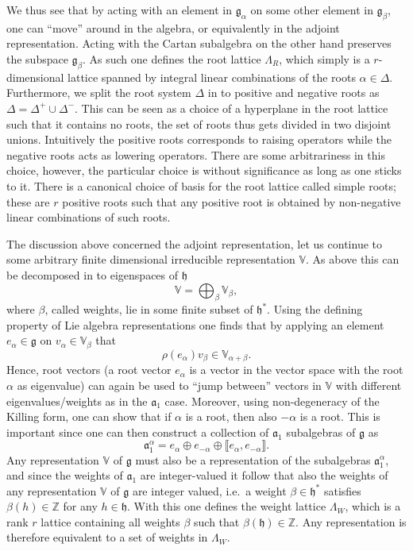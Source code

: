 We thus see that by acting with an element in $\mathfrak{g}_\alpha$ on some other element in $\mathfrak{g}_\beta$, one can ``move'' around in the algebra, or equivalently in the adjoint representation. Acting with the Cartan subalgebra on the other hand preserves the subspace $\mathfrak{g}_\beta$. As such one defines the root lattice $\Lambda_R$, which simply is a $r$-dimensional lattice spanned by integral linear combinations of the roots $\alpha\in\Delta$. Furthermore, we split the root system $\Delta$ in to positive and negative roots as $\Delta = \Delta^+\cup\Delta^-$. This can be seen as a choice of a hyperplane in the root lattice such that it contains no roots, the set of roots thus gets divided in two disjoint unions. Intuitively the positive roots corresponds to raising operators while the negative roots acts as lowering operators. There are some arbitrariness in this choice, however, the particular choice is without significance as long as one sticks to it. There is a canonical choice of basis for the root lattice called simple roots; these are $r$ positive roots such that any positive root is obtained by non-negative linear combinations of such roots. 

The discussion above concerned the adjoint representation, let us continue to some arbitrary finite dimensional irreducible representation $\mathbb{V}$. As above this can be decomposed in to eigenspaces of $\mathfrak{h}$
\begin{equation}
    \mathbb{V} = \bigoplus_\beta \mathbb{V}_\beta,
\end{equation}
where $\beta$, called weights, lie in some finite subset of $\mathfrak{h}^*$. Using the defining property of Lie algebra representations one finds that by applying an element $e_\alpha\in\mathfrak{g}$ on $v_\alpha\in\mathbb{V}_\beta$ that 
\begin{equation}
    \rho(e_\alpha)v_\beta \in \mathbb{V}_{\alpha+\beta}.
\end{equation}
Hence, root vectors (a root vector $e_\alpha$ is a vector in the vector space with the root $\alpha$ as eigenvalue) can again be used to ``jump between'' vectors in $\mathbb{V}$ with different eigenvalues/weights as in the $\mathfrak{a}_1$ case. Moreover, using non-degeneracy of the Killing form, one can show that if $\alpha$ is a root, then also $-\alpha$ is a root. This is important since one can then construct a collection of $\mathfrak{a}_1$ subalgebras of $\mathfrak{g}$ as 
\begin{equation}
    \mathfrak{a}_1^\alpha = e_\alpha \oplus e_{-\alpha} \oplus \llbracket e_\alpha,e_{-\alpha}\rrbracket.
\end{equation}
Any representation $\mathbb{V}$ of $\mathfrak{g}$ must also be a representation of the subalgebras $\mathfrak{a}_1^\alpha$, and since the weights of $\mathfrak{a}_1$ are integer-valued it follow that also the weights of any representation $\mathbb{V}$ of $\mathfrak{g}$ are integer valued, i.e.\ a weight $\beta\in\mathfrak{h}^*$ satisfies $\beta(h)\in\mathbb{Z}$ for any $h\in\mathfrak{h}$. With this one defines the weight lattice $\Lambda_W$, which is a rank $r$ lattice containing all weights $\beta$ such that $\beta(\mathfrak{h})\in\mathbb{Z}$. Any representation is therefore equivalent to a set of weights in $\Lambda_W$. 

